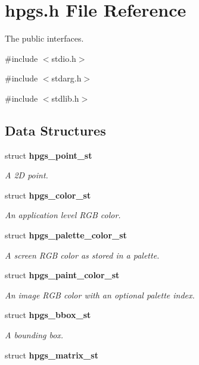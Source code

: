 \section{hpgs.h File Reference}
\label{hpgs_8h}


The public interfaces.  


{\ttfamily \#include $<$stdio.h$>$}\par
{\ttfamily \#include $<$stdarg.h$>$}\par
{\ttfamily \#include $<$stdlib.h$>$}\par
\subsection*{Data Structures}
\begin{DoxyCompactItemize}
\item 
struct {\bf hpgs\_\-point\_\-st}
\begin{DoxyCompactList}\small\item\em A 2D point. \item\end{DoxyCompactList}\item 
struct {\bf hpgs\_\-color\_\-st}
\begin{DoxyCompactList}\small\item\em An application level RGB color. \item\end{DoxyCompactList}\item 
struct {\bf hpgs\_\-palette\_\-color\_\-st}
\begin{DoxyCompactList}\small\item\em A screen RGB color as stored in a palette. \item\end{DoxyCompactList}\item 
struct {\bf hpgs\_\-paint\_\-color\_\-st}
\begin{DoxyCompactList}\small\item\em An image RGB color with an optional palette index. \item\end{DoxyCompactList}\item 
struct {\bf hpgs\_\-bbox\_\-st}
\begin{DoxyCompactList}\small\item\em A bounding box. \item\end{DoxyCompactList}\item 
struct {\bf hpgs\_\-matrix\_\-st}

\end{DoxyCompactItemize}
